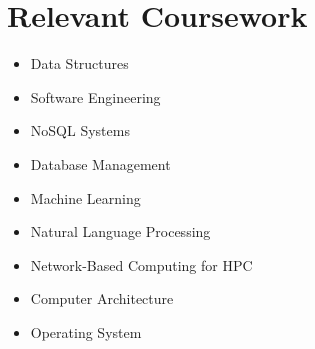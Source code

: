 \documentclass[letterpaper,11pt]{article}
\makeatletter
\newcommand{\resumeItem}[1]{
  \item\small{
    {#1 \vspace{-2pt}}
  }
}
\newcommand{\resumeSubheading}[4]{
  \vspace{-2pt}\item
    \begin{tabular*}{1.0\textwidth}[t]{l@{\extracolsep{\fill}}r}
      \textbf{#1} & \textbf{\small #2} \\
      \textit{\small#3} & \textit{\small #4} \\
    \end{tabular*}\vspace{-7pt}
}
\newcommand{\resumeSubHeadingListStart}{\begin{itemize}[leftmargin=0.0in, label={}]}
\newcommand{\resumeSubHeadingListEnd}{\end{itemize}}
\newcommand{\resumeItemListStart}{\begin{itemize}}
\newcommand{\resumeItemListEnd}{\end{itemize}\vspace{-5pt}}
\makeatother
\begin{document}
\section{Relevant Coursework}
        \begin{multicols}{3}
            \begin{itemize}[itemsep=-5pt, parsep=3pt]
                \item \small Data Structures
                \item Software Engineering
                \item NoSQL Systems
                \item Database Management
                \item Machine Learning
                \item \small Natural Language Processing
                \item \small Network-Based Computing for HPC
                \item Computer Architecture
                \item Operating System
            \end{itemize}
        \end{multicols}
        \vspace*{2.0\multicolsep}


        
\end{document}
